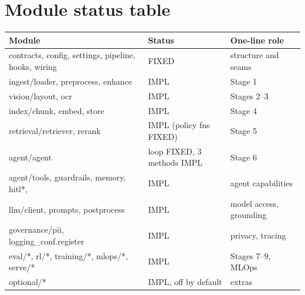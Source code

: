 \section{Module status table}
\begin{center}\small
\begin{tabular}{@{}p{5.2cm}p{2.1cm}p{7cm}@{}}
\toprule Module & Status & One-line role \\ \midrule
contracts, config, settings, pipeline, hooks, wiring & FIXED & structure and seams \\
ingest/loader, preprocess, enhance & IMPL & Stage 1 \\
vision/layout, ocr & IMPL & Stages 2--3 \\
index/chunk, embed, store & IMPL & Stage 4 \\
retrieval/retriever, rerank & IMPL (policy fns FIXED) & Stage 5 \\
agent/agent & loop FIXED, 3 methods IMPL & Stage 6 \\
agent/tools, guardrails, memory, hitl*, & IMPL & agent capabilities \\
llm/client, prompts, postprocess & IMPL & model access, grounding \\
governance/pii, logging\_conf.register & IMPL & privacy, tracing \\
eval/*, rl/*, training/*, mlops/*, serve/* & IMPL & Stages 7--9, MLOps \\
optional/* & IMPL, off by default & extras \\
\bottomrule\end{tabular}
\end{center}
